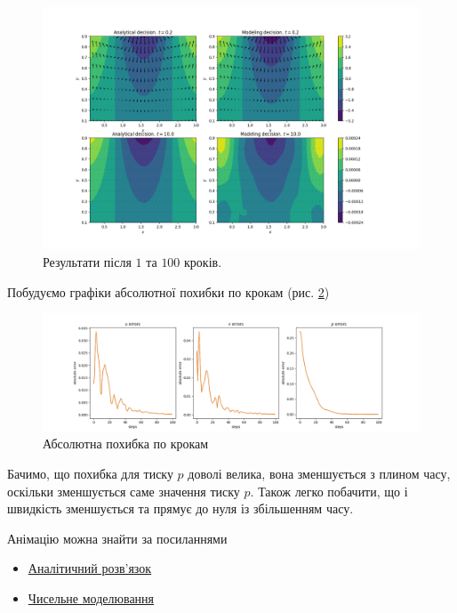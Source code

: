 \documentclass[a4paper,12pt]{article}
\begin{document}
\begin{figure}[h]
	\center \includegraphics[scale=0.5]{Figure_1.png}
	\caption{Результати після $1$ та $100$ кроків.} \label{ris:1}
\end{figure}

Побудуємо графіки абсолютної похибки по крокам (рис. \ref{ris:2})

\begin{figure}[h]
	\center \includegraphics[scale=0.4]{Figure_2.png}
	\caption{Абсолютна похибка по крокам} \label{ris:2}
\end{figure}

Бачимо, що похибка для тиску $p$ доволі велика, вона зменшується з плином часу, оскільки зменшується саме значення тиску $p$. Також легко побачити, що і швидкість зменшується та прямує до нуля із збільшенням часу.

Анімацію можна знайти за посиланнями
\begin{itemize}
	\item \href{https://github.com/AlKravets/Numerical-model-of-dynamics-of-systems/blob/master/lab3/gif/analit_anim.gif}{Аналітичний розв'язок}
	\item \href{https://github.com/AlKravets/Numerical-model-of-dynamics-of-systems/blob/master/lab3/gif/model_anim.gif}{Чисельне моделювання}
\end{itemize}
\end{document}

